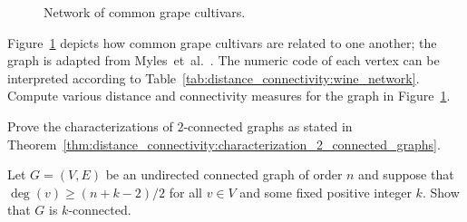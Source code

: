 \begin{problem}
\begin{figure}[!htbp]
\centering
{}

\caption{Network of common grape cultivars.}
\label{fig:distance_connectivity:wine_network}
\end{figure}

\item Figure~\ref{fig:distance_connectivity:wine_network} depicts how
  common grape cultivars are related to one another; the
  graph is adapted from Myles~et~al.~\cite{MylesEtAl2010}. The numeric
  code of each vertex can be interpreted according to
  Table~\ref{tab:distance_connectivity:wine_network}. Compute various
  distance and connectivity measures for the graph in
  Figure~\ref{fig:distance_connectivity:wine_network}.

\item Prove the characterizations of $2$-connected graphs as stated in
  Theorem~\ref{thm:distance_connectivity:characterization_2_connected_graphs}.

\item Let $G = (V,E)$ be an undirected connected graph of order $n$
  and suppose that $\deg(v) \geq (n + k - 2) / 2$ for all $v \in V$
  and some fixed positive integer $k$. Show that $G$ is
  $k$-connected.
\end{problem}
